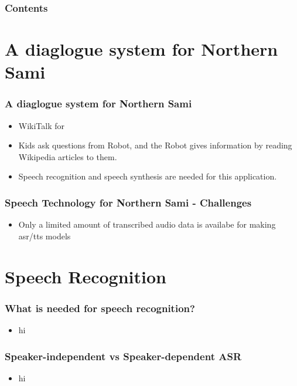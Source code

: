 \begin{frame}
\frametitle{Contents}
\tableofcontents
\end{frame}



\section{A diaglogue system for Northern Sami}
\begin{frame}
\frametitle{A diaglogue system for Northern Sami}
\begin{itemize}
\item WikiTalk for \ns
\item Kids ask questions from Robot, and the Robot gives information by reading Wikipedia articles to them.
\item Speech recognition and speech synthesis are needed for this application.
\end{itemize}
\end{frame}

\begin{frame}
\frametitle{Speech Technology for Northern Sami - Challenges}
\begin{itemize}
\item Only a limited amount of transcribed audio data is availabe for making asr/tts models
\end{itemize}
\end{frame}



\section{Speech Recognition}
\begin{frame}
\frametitle{What is needed for speech recognition?}
\begin{itemize}
\item hi
\end{itemize}
\end{frame}

\begin{frame}
\frametitle{Speaker-independent vs Speaker-dependent ASR}
\begin{itemize}
\item hi
\end{itemize}
\end{frame}


